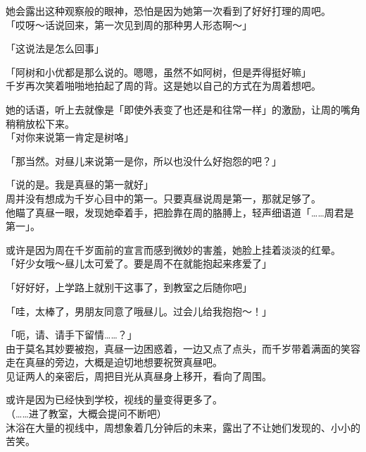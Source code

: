 她会露出这种观察般的眼神，恐怕是因为她第一次看到了好好打理的周吧。\\

「哎呀～话说回来，第一次见到周的那种男人形态啊～」

「这说法是怎么回事」

「阿树和小优都是那么说的。嗯嗯，虽然不如阿树，但是弄得挺好嘛」\\

千岁再次笑着啪啪地拍起了周的背。这是她以自己的方式在为周着想吧。

她的话语，听上去就像是「即使外表变了也还是和往常一样」的激励，让周的嘴角稍稍放松下来。\\

「对你来说第一肯定是树咯」

「那当然。对昼儿来说第一是你，所以也没什么好抱怨的吧？」

「说的是。我是真昼的第一就好」\\

周并没有想成为千岁心目中的第一。只要真昼说周是第一，那就足够了。\\

他瞄了真昼一眼，发现她牵着手，把脸靠在周的胳膊上，轻声细语道「……周君是第一」。

或许是因为周在千岁面前的宣言而感到微妙的害羞，她脸上挂着淡淡的红晕。\\

「好少女哦～昼儿太可爱了。要是周不在就能抱起来疼爱了」

「好好好，上学路上就别干这事了，到教室之后随你吧」

「哇，太棒了，男朋友同意了哦昼儿。过会儿给我抱抱～！」

「呃，请、请手下留情……？」\\

由于莫名其妙要被抱，真昼一边困惑着，一边又点了点头，而千岁带着满面的笑容走在真昼的旁边，大概是迫切地想要祝贺真昼吧。\\

见证两人的亲密后，周把目光从真昼身上移开，看向了周围。

或许是因为已经快到学校，视线的量变得更多了。\\

（……进了教室，大概会提问不断吧）\\

沐浴在大量的视线中，周想象着几分钟后的未来，露出了不让她们发现的、小小的苦笑。
